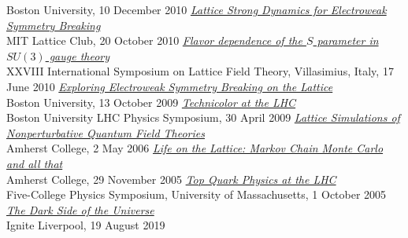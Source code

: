 \begin{spacelist}
\begin{revnumerate}
      Boston University, 10 December 2010
    \pagebreakitem
      \textit{\href{http://www.davidschaich.net/talks/1010MIT.pdf}{Lattice Strong Dynamics for Electroweak Symmetry Breaking}} \\
      MIT Lattice Club, 20 October 2010
    \pagebreakitem
      \textit{\href{http://www.davidschaich.net/talks/Lattice10.pdf}{Flavor dependence of the $S$ parameter in $SU(3)$ gauge theory}} \\
      XXVIII International Symposium on Lattice Field Theory, Villasimius, Italy, 17 June 2010
    \pagebreakitem
      \textit{\href{http://www.davidschaich.net/talks/EWSB_lattice.pdf}{Exploring Electroweak Symmetry Breaking on the Lattice}} \\
      Boston University, 13 October 2009
    \pagebreakitem
      \textit{\href{http://www.davidschaich.net/talks/TC_LHC.pdf}{Technicolor at the LHC}} \\
      Boston University LHC Physics Symposium, 30 April 2009
    \pagebreakitem
      \textit{\href{http://www.davidschaich.net/talks/thesisDefense.pdf}{Lattice Simulations of Nonperturbative Quantum Field Theories}} \\
      Amherst College, 2 May 2006
    \pagebreakitem
      \textit{\href{http://www.davidschaich.net/talks/thesisTalk.pdf}{Life on the Lattice: Markov Chain Monte Carlo and all that}} \\
      Amherst College, 29 November 2005
    \pagebreakitem
      \textit{\href{http://www.davidschaich.net/talks/topMass.pdf}{Top Quark Physics at the LHC}} \\
      Five-College Physics Symposium, University of Massachusetts, 1 October 2005 \\
%
%
%
\newpage
\hspace{-22 pt}{\large \bfseries Public engagement} \vspace{-8 pt}
    \pagebreakitem
      \textit{\href{http://www.davidschaich.net/talks/1908Ignite.pdf}{The Dark Side of the Universe}} \\
      Ignite Liverpool, 19 August 2019 \\
%
%
%

\end{revnumerate}
\end{spacelist}
